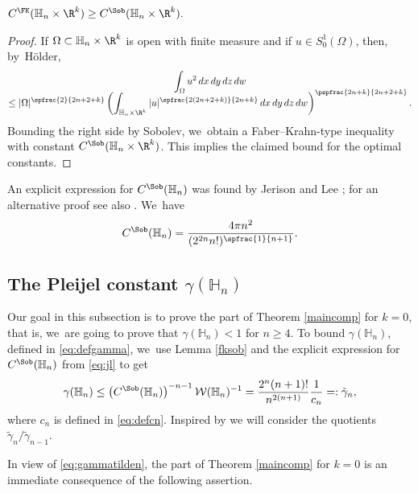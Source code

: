 \begin{lemma}\label{fksob}
$
C^\FK(\mathbb H_n\times\R^k) \geq C^\Sob(\mathbb H_n\times\R^k).
$
\end{lemma}

\begin{proof}
If $\Omega\subset\mathbb H_n\times\R^k$ is open with finite measure and if $u\in S^1_0(\Omega)$, then, by~Hölder,
\begin{multline*}
\int_\Omega u^2 \,dx\,dy\,dz\,dw\\[-8pt]
\leq |\Omega|^{\spfrac{2}{2n+2+k}} \left(\int_{\mathbb H_n\times\R^k} |u|^{\spfrac{2(2n+2+k)}{2n+k}}\,dx\,dy\,dz\,dw\right)^{\pspfrac{2n+k}{2n+2+k}}.
\end{multline*}
Bounding the right side by Sobolev, we~obtain a Faber--Krahn-type inequality with constant $C^\Sob(\mathbb H_n\times\R^k)$. This implies the claimed bound for the optimal constants.
\end{proof}

An explicit expression for $C^\Sob(\mathbb H_n)$ was found by Jerison and Lee \cite{JL}; for an alternative proof see also \cite{FrLi}. We~have
\begin{equation}\label{eq:jl}
C^\Sob(\mathbb H_n) = \frac{4\pi n^2}{(2^{2n} n!)^\spfrac{1}{n+1}}.
\end{equation}

\subsection{The Pleijel constant $\gamma(\mathbb H_n)$}\label{sec:maincompk0}
Our goal in this subsection is to prove the part of Theorem \ref{maincomp} for $k=0$, that is, we~are going to prove that $\gamma(\mathbb H_n)<1$ for $n\geq 4$. To bound $\gamma(\mathbb H_n)$, defined in \eqref{eq:defgamma}, we~use Lemma \ref{fksob} and the explicit expression for $C^\Sob(\mathbb H_n)$ from \eqref{eq:jl} to get
\begin{equation}
\label{eq:gammatilden}
\gamma(\mathbb H_n) \leq \left(C^\Sob(\mathbb H_n)\right)^{-n-1} \mathcal W(\mathbb H_n)^{-1} = \frac{2^n(n+1)!}{n^{2(n+1)}} \frac{1}{c_n} =: \tilde\gamma_n,
\end{equation}
where $c_n$ is defined in \eqref{eq:defcn}. Inspired by \cite{HPS} we will consider the quotients $\tilde\gamma_n/\tilde\gamma_{n-1}$.

In view of \eqref{eq:gammatilden}, the part of Theorem \ref{maincomp} for $k=0$ is an immediate consequence of the following assertion.

